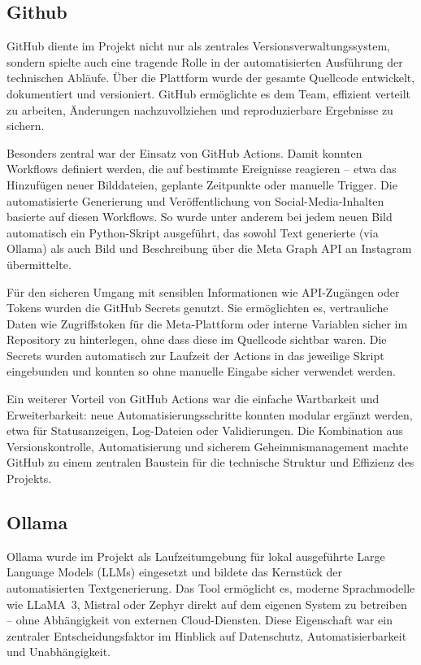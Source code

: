 \documentclass[a4paper,12pt]{article}
\begin{document}
\subsection{Github}

GitHub diente im Projekt nicht nur als zentrales Versionsverwaltungssystem, sondern spielte auch eine tragende Rolle in der automatisierten Ausführung der technischen Abläufe. Über die Plattform wurde der gesamte Quellcode entwickelt, dokumentiert und versioniert. GitHub ermöglichte es dem Team, effizient verteilt zu arbeiten, Änderungen nachzuvollziehen und reproduzierbare Ergebnisse zu sichern.

Besonders zentral war der Einsatz von GitHub Actions. Damit konnten Workflows definiert werden, die auf bestimmte Ereignisse reagieren – etwa das Hinzufügen neuer Bilddateien, geplante Zeitpunkte oder manuelle Trigger. Die automatisierte Generierung und Veröffentlichung von Social-Media-Inhalten basierte auf diesen Workflows. So wurde unter anderem bei jedem neuen Bild automatisch ein Python-Skript ausgeführt, das sowohl Text generierte (via Ollama) als auch Bild und Beschreibung über die Meta Graph API an Instagram übermittelte.

Für den sicheren Umgang mit sensiblen Informationen wie API-Zugängen oder Tokens wurden die GitHub Secrets genutzt. Sie ermöglichten es, vertrauliche Daten wie Zugriffstoken für die Meta-Plattform oder interne Variablen sicher im Repository zu hinterlegen, ohne dass diese im Quellcode sichtbar waren. Die Secrets wurden automatisch zur Laufzeit der Actions in das jeweilige Skript eingebunden und konnten so ohne manuelle Eingabe sicher verwendet werden.

Ein weiterer Vorteil von GitHub Actions war die einfache Wartbarkeit und Erweiterbarkeit: neue Automatisierungsschritte konnten modular ergänzt werden, etwa für Statusanzeigen, Log-Dateien oder Validierungen. Die Kombination aus Versionskontrolle, Automatisierung und sicherem Geheimnismanagement machte GitHub zu einem zentralen Baustein für die technische Struktur und Effizienz des Projekts.

\subsection{Ollama}

Ollama wurde im Projekt als Laufzeitumgebung für lokal ausgeführte Large Language Models (LLMs) eingesetzt und bildete das Kernstück der automatisierten Textgenerierung. Das Tool ermöglicht es, moderne Sprachmodelle wie LLaMA~3, Mistral oder Zephyr direkt auf dem eigenen System zu betreiben – ohne Abhängigkeit von externen Cloud-Diensten. Diese Eigenschaft war ein zentraler Entscheidungsfaktor im Hinblick auf Datenschutz, Automatisierbarkeit und Unabhängigkeit.
\end{document}
